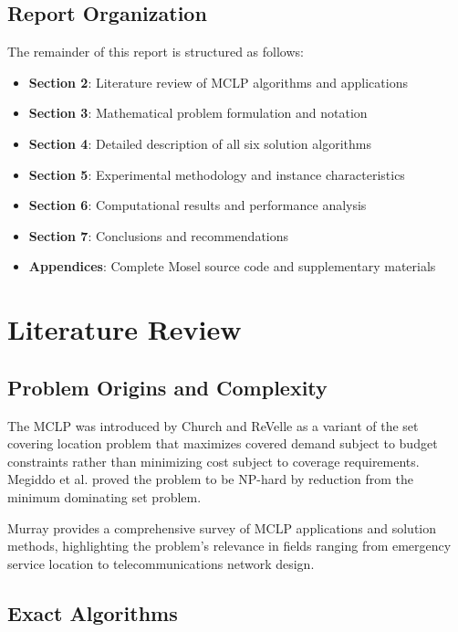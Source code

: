 \documentclass[11pt,a4paper]{article}
\begin{document}
\subsection{Report Organization}

The remainder of this report is structured as follows:
\begin{itemize}
  \item \textbf{Section 2}: Literature review of MCLP algorithms and applications
  \item \textbf{Section 3}: Mathematical problem formulation and notation
  \item \textbf{Section 4}: Detailed description of all six solution algorithms
  \item \textbf{Section 5}: Experimental methodology and instance characteristics
  \item \textbf{Section 6}: Computational results and performance analysis
  \item \textbf{Section 7}: Conclusions and recommendations
  \item \textbf{Appendices}: Complete Mosel source code and supplementary materials
\end{itemize}

\newpage
\section{Literature Review}

\subsection{Problem Origins and Complexity}

The MCLP was introduced by Church and ReVelle \cite{church1974} as a variant of the set covering location problem that maximizes covered demand subject to budget constraints rather than minimizing cost subject to coverage requirements. Megiddo et al. \cite{megiddo1983} proved the problem to be NP-hard by reduction from the minimum dominating set problem.

Murray \cite{murray2016} provides a comprehensive survey of MCLP applications and solution methods, highlighting the problem's relevance in fields ranging from emergency service location to telecommunications network design.

\subsection{Exact Algorithms}
\end{document}
